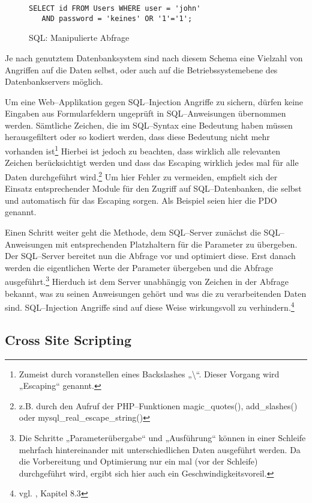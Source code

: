 \begin{figure}[h]
\begin{verbatim}
SELECT id FROM Users WHERE user = 'john' 
   AND password = 'keines' OR '1'='1';
\end{verbatim}
\caption{SQL: Manipulierte Abfrage}
\label{abb:injsql}
\end{figure}

Je nach genutztem Datenbanksystem sind nach diesem Schema eine Vielzahl von Angriffen auf die Daten selbst, oder auch auf die Betriebssystemebene des Datenbankservers möglich.

Um eine Web--Applikation gegen SQL--Injection Angriffe zu sichern, dürfen keine Eingaben aus Formularfeldern ungeprüft in SQL--Anweisungen übernommen werden. Sämtliche Zeichen, die im SQL--Syntax eine Bedeutung haben müssen herausgefiltert oder so kodiert werden, dass diese Bedeutung nicht mehr vorhanden ist\footnote{Zumeist durch voranstellen eines Backslashes „\textbackslash“. Dieser Vorgang wird „Escaping“ genannt.} Hierbei ist jedoch zu beachten, dass wirklich alle relevanten Zeichen berücksichtigt werden und dass das Escaping wirklich jedes mal für alle Daten durchgeführt wird.\footnote{z.B. durch den Aufruf der PHP--Funktionen magic\_quotes(), add\_slashes() oder mysql\_real\_escape\_string()}
Um hier Fehler zu vermeiden, empfielt sich der Einsatz entsprechender Module für den Zugriff auf SQL--Datenbanken, die selbst und automatisch für das Escaping sorgen. Als Beispiel seien hier die \ac{PDO} genannt.

Einen Schritt weiter geht die Methode, dem SQL--Server zunächst die SQL--Anweisungen mit entsprechenden Platzhaltern für die Parameter zu übergeben. Der SQL--Server bereitet nun die Abfrage vor und optimiert diese. Erst danach werden die eigentlichen Werte der Parameter übergeben und die Abfrage ausgeführt.\footnote{Die Schritte „Parameterübergabe“ und „Ausführung“ können in einer Schleife mehrfach hintereinander mit unterschiedlichen Daten ausgeführt werden. Da die Vorbereitung und Optimierung nur ein mal (vor der Schleife) durchgeführt wird, ergibt sich hier auch ein Geschwindigkeitsvoreil.} Hierduch ist dem Server unabhängig von Zeichen in der Abfrage bekannt, was zu seinen Anweisungen gehört und was die zu verarbeitenden Daten sind. SQL--Injection Angriffe sind auf diese Weise wirkungsvoll zu verhindern.\footnote{vgl. \cite{clarke}, Kapitel 8.3}

\subsection{Cross Site Scripting}

